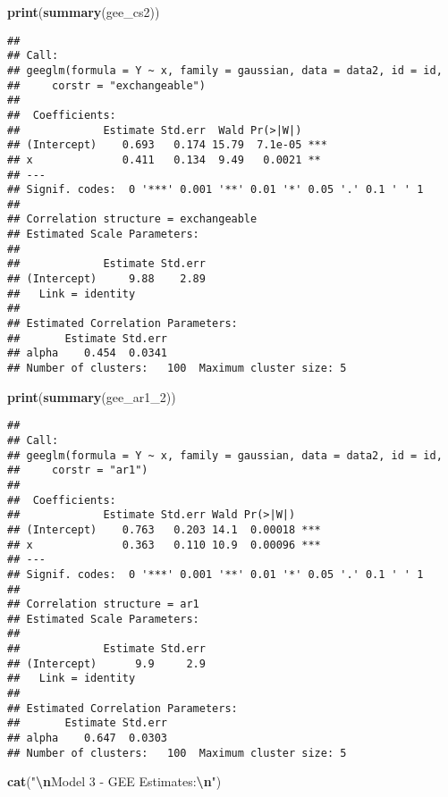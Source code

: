 \documentclass[
]{article}
\newenvironment{Shaded}{\begin{snugshade}}{\end{snugshade}}
\newcommand{\FunctionTok}[1]{\textcolor[rgb]{0.13,0.29,0.53}{\textbf{#1}}}
\newcommand{\NormalTok}[1]{#1}
\newcommand{\SpecialCharTok}[1]{\textcolor[rgb]{0.81,0.36,0.00}{\textbf{#1}}}
\newcommand{\StringTok}[1]{\textcolor[rgb]{0.31,0.60,0.02}{#1}}
\begin{document}
\begin{Shaded}
\begin{Highlighting}[]
\FunctionTok{print}\NormalTok{(}\FunctionTok{summary}\NormalTok{(gee\_cs2))}
\end{Highlighting}
\end{Shaded}

\begin{verbatim}
## 
## Call:
## geeglm(formula = Y ~ x, family = gaussian, data = data2, id = id, 
##     corstr = "exchangeable")
## 
##  Coefficients:
##             Estimate Std.err  Wald Pr(>|W|)    
## (Intercept)    0.693   0.174 15.79  7.1e-05 ***
## x              0.411   0.134  9.49   0.0021 ** 
## ---
## Signif. codes:  0 '***' 0.001 '**' 0.01 '*' 0.05 '.' 0.1 ' ' 1
## 
## Correlation structure = exchangeable 
## Estimated Scale Parameters:
## 
##             Estimate Std.err
## (Intercept)     9.88    2.89
##   Link = identity 
## 
## Estimated Correlation Parameters:
##       Estimate Std.err
## alpha    0.454  0.0341
## Number of clusters:   100  Maximum cluster size: 5
\end{verbatim}

\begin{Shaded}
\begin{Highlighting}[]
\FunctionTok{print}\NormalTok{(}\FunctionTok{summary}\NormalTok{(gee\_ar1\_2))}
\end{Highlighting}
\end{Shaded}

\begin{verbatim}
## 
## Call:
## geeglm(formula = Y ~ x, family = gaussian, data = data2, id = id, 
##     corstr = "ar1")
## 
##  Coefficients:
##             Estimate Std.err Wald Pr(>|W|)    
## (Intercept)    0.763   0.203 14.1  0.00018 ***
## x              0.363   0.110 10.9  0.00096 ***
## ---
## Signif. codes:  0 '***' 0.001 '**' 0.01 '*' 0.05 '.' 0.1 ' ' 1
## 
## Correlation structure = ar1 
## Estimated Scale Parameters:
## 
##             Estimate Std.err
## (Intercept)      9.9     2.9
##   Link = identity 
## 
## Estimated Correlation Parameters:
##       Estimate Std.err
## alpha    0.647  0.0303
## Number of clusters:   100  Maximum cluster size: 5
\end{verbatim}

\begin{Shaded}
\begin{Highlighting}[]
\FunctionTok{cat}\NormalTok{(}\StringTok{"}\SpecialCharTok{\textbackslash{}n}\StringTok{Model 3 {-} GEE Estimates:}\SpecialCharTok{\textbackslash{}n}\StringTok{"}\NormalTok{)}
\end{Highlighting}
\end{Shaded}
\end{document}
